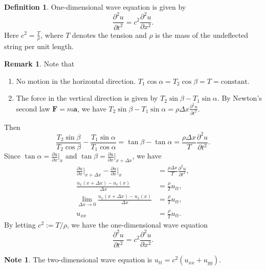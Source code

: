 \documentclass[12pt,openany]{book}
\theoremstyle{definition}
\newtheorem{definition}{Definition}[chapter]
\newtheorem{remark}{Remark}[chapter]
\newtheorem*{note}{Note}
\begin{document}
	\newpage
	\begin{tcolorbox}[colframe=defcolor, title={\color{white}\bf One-Dimensional Wave Equation}]
		\begin{definition}
			One-dimensional wave equation is given by
			\[
			\frac{\partial^2 u}{\partial t^2} = c^2 \frac{\partial^2 u}{\partial x^2}.
			\]
			Here \( c^2 = \frac{T}{\rho} \), where \( T \) denotes the tension and \( \rho \) is the mass of the undeflected string per unit length.
		\end{definition}
	\end{tcolorbox}
	\begin{remark}
		Note that \begin{enumerate}[(1)]
			\item No motion in the horizontal direction. $\displaystyle T_1 \cos \alpha = T_2 \cos \beta = T = \text{constant}. $
			\item The force in the vertical direction is given by $T_2\sin\beta-T_1\sin\alpha$. By Newton's second law $\textbf{F}=m\textbf{a}$, we have $\displaystyle T_2 \sin \beta - T_1 \sin \alpha = \rho \Delta x \frac{\partial^2 u}{\partial t^2}. $
		\end{enumerate} Then \[
	\frac{T_2 \sin \beta}{T_2 \cos \beta} - \frac{T_1 \sin \alpha}{T_1 \cos \alpha} = \tan \beta - \tan \alpha = \frac{\rho \Delta x }{T}\frac{\partial^2 u}{\partial t^2}.
	\] Since $\displaystyle\tan \alpha =\frac{\partial u}{\partial x}\bigg|_x$ and $\tan \beta=\frac{\partial u}{\partial x}\bigg|_{x+\Delta x}$, we have \begin{align*}
		 \frac{\partial u}{\partial x}\bigg|_{x+\Delta x}-\frac{\partial u}{\partial x}\bigg|_x&=\frac{\rho \Delta x }{T}\frac{\partial^2 u}{\partial t^2},\\
		 \frac{u_x(x+\Delta x)-u_x(x)}{\Delta x}&=\frac{\rho}{T}u_{tt},\\
		 \lim\limits_{\Delta x\to 0}\frac{u_x(x+\Delta x)-u_x(x)}{\Delta x}&=\frac{\rho}{T}u_{tt},\\
		 u_{xx}&=\frac{\rho}{T}u_{tt}.
	\end{align*} By letting $c^2:=T/\rho$, we have the one-dimensional wave equation \[
	\frac{\partial^2 u}{\partial t^2} = c^2 \frac{\partial^2 u}{\partial x^2}.
	\]
	\end{remark}
	\vspace{12pt}
	\begin{note}
		The two-dimensional wave equation is $u_{tt}=c^2(u_{xx}+u_{yy})$.
	\end{note}
\end{document}
